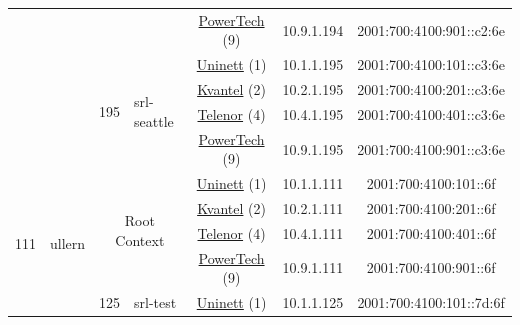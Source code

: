 \begin{small}
\begin{center}
\begin{longtable}{|c|c|c|c|c|c|c|c|}
  &  &  &  & \multicolumn{2}{|c|}{\tiny{\href{http://www.powertech.no}{PowerTech} (9)}} & \tiny{10.9.1.194} & \tiny{2001:700:4100:901::c2:6e} \\* \cline{3-3}\cline{4-4}\cline{5-5}\cline{6-6}\cline{7-7}\cline{8-8}
  &  & \multirow{4}{*}{\tiny{195}} & \multicolumn{1}{|l|}{\multirow{4}{*}{\tiny{srl-seattle}}} & \multicolumn{2}{|c|}{\tiny{\href{https://www.uninett.no}{Uninett} (1)}} & \tiny{10.1.1.195} & \tiny{2001:700:4100:101::c3:6e} \\* \cline{5-5}\cline{6-6}\cline{7-7}\cline{8-8}
  &  &  &  & \multicolumn{2}{|c|}{\tiny{\href{http://kvantel.no}{Kvantel} (2)}} & \tiny{10.2.1.195} & \tiny{2001:700:4100:201::c3:6e} \\* \cline{5-5}\cline{6-6}\cline{7-7}\cline{8-8}
  &  &  &  & \multicolumn{2}{|c|}{\tiny{\href{https://www.telenor.no}{Telenor} (4)}} & \tiny{10.4.1.195} & \tiny{2001:700:4100:401::c3:6e} \\* \cline{5-5}\cline{6-6}\cline{7-7}\cline{8-8}
  &  &  &  & \multicolumn{2}{|c|}{\tiny{\href{http://www.powertech.no}{PowerTech} (9)}} & \tiny{10.9.1.195} & \tiny{2001:700:4100:901::c3:6e} \\ \hline
 \multirow{24}{*}{\tiny{111}} & \multicolumn{1}{|l|}{\multirow{24}{*}{\tiny{ullern}}} & \multicolumn{2}{|c|}{\multirow{4}{*}{\tiny{Root Context}}} & \multicolumn{2}{|c|}{\tiny{\href{https://www.uninett.no}{Uninett} (1)}} & \tiny{10.1.1.111} & \tiny{2001:700:4100:101::6f} \\* \cline{5-5}\cline{6-6}\cline{7-7}\cline{8-8}
  &  & \multicolumn{2}{|c|}{} & \multicolumn{2}{|c|}{\tiny{\href{http://kvantel.no}{Kvantel} (2)}} & \tiny{10.2.1.111} & \tiny{2001:700:4100:201::6f} \\* \cline{5-5}\cline{6-6}\cline{7-7}\cline{8-8}
  &  & \multicolumn{2}{|c|}{} & \multicolumn{2}{|c|}{\tiny{\href{https://www.telenor.no}{Telenor} (4)}} & \tiny{10.4.1.111} & \tiny{2001:700:4100:401::6f} \\* \cline{5-5}\cline{6-6}\cline{7-7}\cline{8-8}
  &  & \multicolumn{2}{|c|}{} & \multicolumn{2}{|c|}{\tiny{\href{http://www.powertech.no}{PowerTech} (9)}} & \tiny{10.9.1.111} & \tiny{2001:700:4100:901::6f} \\* \cline{3-3}\cline{4-4}\cline{5-5}\cline{6-6}\cline{7-7}\cline{8-8}
  &  & \multirow{4}{*}{\tiny{125}} & \multicolumn{1}{|l|}{\multirow{4}{*}{\tiny{srl-test}}} & \multicolumn{2}{|c|}{\tiny{\href{https://www.uninett.no}{Uninett} (1)}} & \tiny{10.1.1.125} & \tiny{2001:700:4100:101::7d:6f} \\* \cline{5-5}\cline{6-6}\cline{7-7}\cline{8-8}

\end{longtable}
\end{center}
\end{small}
